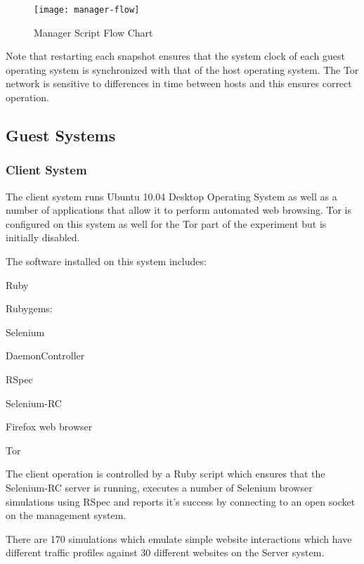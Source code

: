 \begin{figure}[H]
  \centering\texttt{[image: manager-flow]}
  \caption{Manager Script Flow Chart}
  \label{manager-flow-diagram}
\end{figure}

Note that restarting each snapshot ensures that the system clock of each guest
operating system is synchronized with that of the host operating system. The
Tor network is sensitive to differences in time between hosts and this ensures
correct operation.

\subsection{Guest Systems}

\subsubsection{Client System}

The client system runs Ubuntu 10.04 Desktop Operating System as well as a
number of applications that allow it to perform automated web browsing. Tor is
configured on this system as well for the Tor part of the experiment but is
initially disabled.

The software installed on this system includes:

\begin{itemize*}
  \item Ruby
  \item Rubygems:
    \begin{itemize*}
      \item Selenium
      \item DaemonController
      \item RSpec
    \end{itemize*}
  \item Selenium-RC
  \item Firefox web browser
  \item Tor
\end{itemize*}

The client operation is controlled by a Ruby script which ensures that the
Selenium-RC server is running, executes a number of Selenium browser
simulations using RSpec and reports it's success by connecting to an open
socket on the management system.

There are 170 simulations which emulate simple website interactions which have
different traffic profiles against 30 different websites on the Server system.

